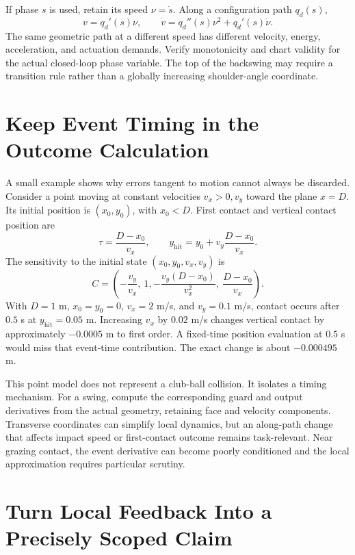 \documentclass[12pt, openany]{book}
\theoremstyle{plain}
\begin{document}
If phase $s$ is used, retain its speed $\nu=\dot s$. Along a configuration path $q_d(s)$,
\begin{equation}
v=q_d'(s)\nu,\qquad
\dot v=q_d''(s)\nu^2+q_d'(s)\dot\nu .
\end{equation}
The same geometric path at a different speed has different velocity, energy, acceleration, and actuation demands. Verify monotonicity and chart validity for the actual closed-loop phase variable. The top of the backswing may require a transition rule rather than a globally increasing shoulder-angle coordinate.

\section{Keep Event Timing in the Outcome Calculation}

A small example shows why errors tangent to motion cannot always be discarded. Consider a point moving at constant velocities $v_x>0,v_y$ toward the plane $x=D$. Its initial position is $(x_0,y_0)$, with $x_0<D$. First contact and vertical contact position are
\begin{equation}
\tau=\frac{D-x_0}{v_x},\qquad
y_{\mathrm{hit}}=y_0+v_y\frac{D-x_0}{v_x} .
\end{equation}
The sensitivity to the initial state $(x_0,y_0,v_x,v_y)$ is
\begin{equation}
C=\left(-\frac{v_y}{v_x},\ 1,
-\frac{v_y(D-x_0)}{v_x^2},\ \frac{D-x_0}{v_x}\right).
\end{equation}
With $D=1$ m, $x_0=y_0=0$, $v_x=2$ m/s, and $v_y=0.1$ m/s, contact occurs after $0.5$ s at $y_{\mathrm{hit}}=0.05$ m. Increasing $v_x$ by $0.02$ m/s changes vertical contact by approximately $-0.0005$ m to first order. A fixed-time position evaluation at $0.5$ s would miss that event-time contribution. The exact change is about $-0.000495$ m.

This point model does not represent a club-ball collision. It isolates a timing mechanism. For a swing, compute the corresponding guard and output derivatives from the actual geometry, retaining face and velocity components. Transverse coordinates can simplify local dynamics, but an along-path change that affects impact speed or first-contact outcome remains task-relevant. Near grazing contact, the event derivative can become poorly conditioned and the local approximation requires particular scrutiny.

\section{Turn Local Feedback Into a Precisely Scoped Claim}
\end{document}
